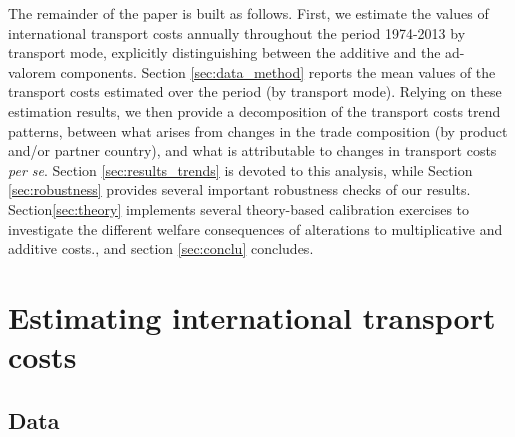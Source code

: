 \documentclass[a4paper,11pt]{article}
\begin{document}
The remainder of the paper is built as follows. First, we estimate the values of international transport costs annually throughout the period 1974-2013 by transport mode, explicitly distinguishing between the additive and the ad-valorem components. Section \ref{sec:data_method} reports the mean values of the transport costs estimated over the period (by transport mode). Relying on these estimation results, we then provide a decomposition of the transport costs trend patterns, between what arises from changes in the trade composition (by product and/or partner country), and what is attributable to changes in transport costs \textit{per se}. Section \ref{sec:results_trends} is devoted to this analysis, while Section \ref{sec:robustness} provides several important robustness checks of our results. Section\ref{sec:theory} implements several theory-based calibration exercises to investigate the different welfare consequences of alterations to multiplicative and additive costs., and section \ref{sec:conclu} concludes.



\section{Estimating international transport costs\label{sec:data_method}}

\subsection{Data}
\end{document}
